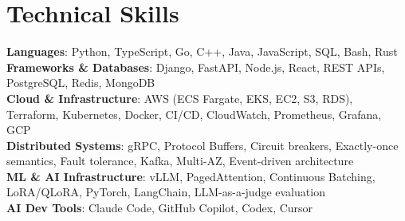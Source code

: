 \documentclass[letterpaper,11pt]{article}
\begin{document}
\section{Technical Skills}
\vspace{-7pt}
\begin{itemize}
[leftmargin=0.15in, label={}]\small{\item{
        \textbf{Languages}{: Python, TypeScript, Go, C++, Java, JavaScript, SQL, Bash, Rust} \\
        \textbf{Frameworks \& Databases}{: Django, FastAPI, Node.js, React, REST APIs, PostgreSQL, Redis, MongoDB} \\
        \textbf{Cloud \& Infrastructure}{: AWS (ECS Fargate, EKS, EC2, S3, RDS), Terraform, Kubernetes, Docker, CI/CD, CloudWatch, Prometheus, Grafana, GCP} \\
        \textbf{Distributed Systems}{: gRPC, Protocol Buffers, Circuit breakers, Exactly-once semantics, Fault tolerance, Kafka, Multi-AZ, Event-driven architecture} \\
        \textbf{ML \& AI Infrastructure}{: vLLM, PagedAttention, Continuous Batching, LoRA/QLoRA, PyTorch, LangChain, LLM-as-a-judge evaluation} \\
        \textbf{AI Dev Tools}{: Claude Code, GitHub Copilot, Codex, Cursor} \\
}}
\end{itemize}
\end{document}
